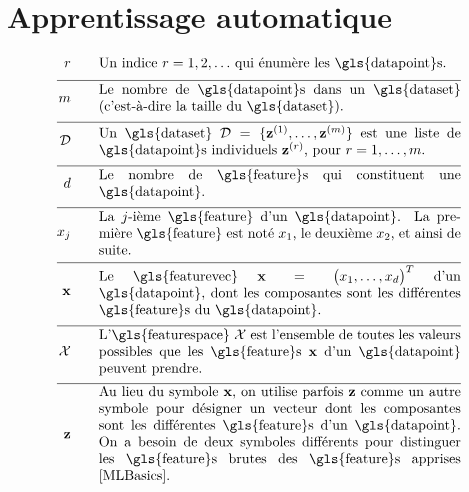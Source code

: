 \newpage
\section*{Apprentissage automatique}

\begin{align}
	\sampleidx \quad\quad & \parbox{.75\textwidth}{Un indice $\sampleidx=1,2,\ldots$ qui énumère les \gls{datapoint}s.}   \nonumber \\[2mm] \hline \nonumber\\[-5mm]
	\samplesize \quad\quad &\parbox{.75\textwidth}{Le nombre de \gls{datapoint}s dans un \gls{dataset} (c’est-à-dire la taille du \gls{dataset}).} \nonumber \\[2mm] \hline \nonumber\\[-5mm] 
	\dataset \quad\quad & \parbox{.75\textwidth}{Un \gls{dataset} $\dataset = \{ \datapoint^{(1)},\ldots, \datapoint^{(\samplesize)} \}$ 
		est une liste de \gls{datapoint}s individuels $\datapoint^{(\sampleidx)}$, pour $\sampleidx=1,\ldots,\samplesize$.}   \nonumber \\[2mm] \hline \nonumber\\[-5mm]
	\featurelen \quad\quad &\parbox{.75\textwidth}{Le nombre de \gls{feature}s qui constituent une \gls{datapoint}.}\nonumber \\[2mm] \hline \nonumber\\[-5mm]
	\feature_{\featureidx} \quad\quad &\parbox{.75\textwidth}{La $\featureidx$-ième \gls{feature} d’un \gls{datapoint}. La première \gls{feature} 
		est noté $\feature_{1}$, le deuxième $\feature_{2}$, et ainsi de suite. } \nonumber \\[2mm] \hline \nonumber\\[-5mm] 
	\featurevec \quad\quad &\parbox{.75\textwidth}{Le \gls{featurevec} $\featurevec=\big(\feature_{1},\ldots,\feature_{\featuredim}\big)^{T}$ d’un \gls{datapoint}, dont les composantes 
		sont les différentes \gls{feature}s du \gls{datapoint}.}\nonumber \\[2mm] \hline \nonumber\\[-5mm]
	\featurespace \quad\quad & \parbox{.75\textwidth}{L'\gls{featurespace} $\featurespace$ est 
		l’ensemble de toutes les valeurs possibles que les \gls{feature}s $\featurevec$ d’un \gls{datapoint} peuvent prendre.} \nonumber \\[2mm] \hline \nonumber\\[-5mm]
	\rawfeaturevec \quad\quad &\parbox{.75\textwidth}{Au lieu du symbole $\featurevec$, on utilise parfois $\rawfeaturevec$ comme un autre symbole pour désigner un vecteur dont les composantes 
		sont les différentes \gls{feature}s d’un \gls{datapoint}. On a besoin de deux symboles différents pour distinguer les \gls{feature}s brutes des \gls{feature}s apprises \cite[Ch. 9]{MLBasics}.}\nonumber
\end{align}

